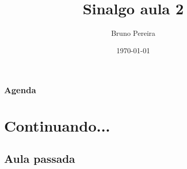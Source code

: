 \documentclass{beamer}
\title[Sinalgo aula 2]{Sinalgo aula 2} %
\author{Bruno Pereira} %
\institute[UFMG] %
{
Universidade Federal de Minas Gerais \\ %
\medskip
\textit{bruno.ps@dcc.ufmg.com} %
}
\date{\tiny\today} %
\begin{document}
\begin{frame}
\titlepage %
\end{frame}

\begin{frame}
\frametitle{Agenda} %
\tableofcontents %
\end{frame}


\section{Continuando...} %

\subsection{Aula passada} %
\end{document}
